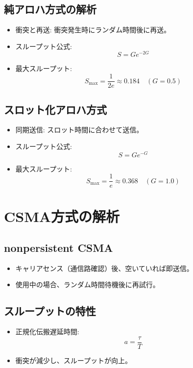 \documentclass[a4paper,12pt]{ltjsarticle}
\begin{document}
\subsection*{純アロハ方式の解析}
\begin{itemize}
    \item 衝突と再送: 衝突発生時にランダム時間後に再送。
    \item スループット公式:
    \[
    S = G e^{-2G}
    \]
    \item 最大スループット: 
    \[
    S_{\text{max}} = \frac{1}{2e} \approx 0.184 \quad (G = 0.5)
    \]
\end{itemize}

\subsection*{スロット化アロハ方式}
\begin{itemize}
    \item 同期送信: スロット時間に合わせて送信。
    \item スループット公式:
    \[
    S = G e^{-G}
    \]
    \item 最大スループット: 
    \[
    S_{\text{max}} = \frac{1}{e} \approx 0.368 \quad (G = 1.0)
    \]
\end{itemize}

\section{CSMA方式の解析}

\subsection*{nonpersistent CSMA}
\begin{itemize}
    \item キャリアセンス（通信路確認）後、空いていれば即送信。
    \item 使用中の場合、ランダム時間待機後に再試行。
\end{itemize}

\subsection*{スループットの特性}
\begin{itemize}
    \item 正規化伝搬遅延時間:
    \[
    a = \frac{\tau}{T}
    \]
    \item 衝突が減少し、スループットが向上。
\end{itemize}
\end{document}
